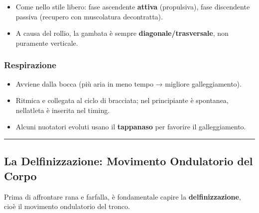 \documentclass[a4paper,11pt]{article}
\providecommand{\tightlist}{%
  \setlength{\itemsep}{0pt}\setlength{\parskip}{0pt}}
\begin{document}
\begin{itemize}
      \tightlist
      \item
            Come nello stile libero: fase ascendente \textbf{attiva} (propulsiva),
            fase discendente passiva (recupero con muscolatura decontratta).
      \item
            A causa del rollio, la gambata è sempre
            \textbf{diagonale/trasversale}, non puramente verticale.
\end{itemize}

\subsubsection{Respirazione}\label{respirazione-1}

\begin{itemize}
      \tightlist
      \item
            Avviene dalla bocca (più aria in meno tempo → migliore
            galleggiamento).
      \item
            Ritmica e collegata al ciclo di bracciata; nel principiante è
            spontanea, nell\textquotesingle atleta è inserita nel timing.
      \item
            Alcuni nuotatori evoluti usano il \textbf{tappanaso} per favorire il
            galleggiamento.
\end{itemize}

\begin{center}\rule{0.5\linewidth}{0.5pt}\end{center}

\subsection{La Delfinizzazione: Movimento Ondulatorio del
      Corpo}\label{la-delfinizzazione-movimento-ondulatorio-del-corpo}

Prima di affrontare rana e farfalla, è fondamentale capire la
\textbf{delfinizzazione}, cioè il movimento ondulatorio del tronco.
\end{document}
